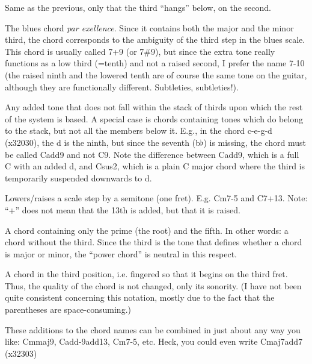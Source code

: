 \begin{articlelayout}
\begin{adjustwidth}{5em}{0em}
\noindent Same as the previous, only that the third ``hangs'' below, on
the second.

\noindent The blues chord \emph{par exellence}. Since it contains both
the major and the minor third, the chord corresponds to the ambiguity
of the third step in the blues scale.  This chord is usually called
7+9 (or 7\#9), but since the extra tone really functions as a low third
(=tenth) and not a raised second, I prefer the name 7-10 (the raised
ninth and the lowered tenth are of course the same tone on the guitar,
although they are functionally different. Subtleties, subtleties!).

\noindent Any added tone that does not fall within the stack of
thirds upon which the rest of the system is based. A special case is chords containing tones which do belong to the stack, but not all the members below it. E.g., in the chord c-e-g-d (x32030), the d is the ninth, but since the seventh (b$\flat$) is missing, the chord must be called Cadd9 and not C9.
Note the difference between Cadd9, which is a full C with an added d, and Csus2, which is a plain C major chord where the third is temporarily suspended downwards to d.

\noindent Lowers/raises a scale step by a semitone (one
fret). E.g. Cm7-5 and C7+13. Note: ``+'' does not mean that the 13th
is added, but that it is raised.

\noindent A chord containing only the prime (the root) and the
fifth. In other words: a chord without the third. Since the third is
the tone that defines whether a chord is major or minor, the ``power
chord'' is neutral in this respect.

\noindent A chord in the third position, i.e. fingered so that
it begins on the third fret. Thus, the quality of the chord is not
changed, only its sonority. (I have not been quite consistent
concerning this notation, mostly due to the fact that the parentheses
are space-consuming.)

\end{adjustwidth}

\bigskip

\noindent These additions to the chord names can be combined in just about any way you like:
Cmmaj9, Cadd-9add13, Cm7-5,  etc. Heck, you could even write Cmaj7add7 (x32303)


\end{articlelayout}
